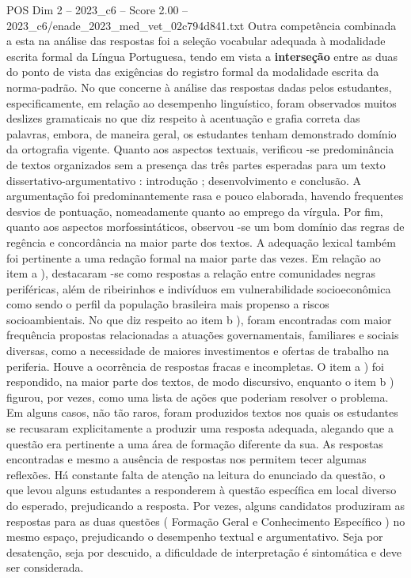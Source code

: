 \begin{textsample}{POS Dim 2 – 2023\_c6 – Score 2.00 – 2023\_c6/enade\_2023\_med\_vet\_02c794d841.txt}
Outra competência combinada a esta na análise das respostas foi a seleção vocabular adequada à modalidade escrita formal da Língua Portuguesa, tendo em vista a \textbf{interseção} entre as duas do ponto de vista das exigências do registro formal da modalidade escrita da norma-padrão.
No que concerne à análise das respostas dadas pelos estudantes, especificamente, em relação ao desempenho linguístico, foram observados muitos deslizes gramaticais no que diz respeito à acentuação e grafia correta das palavras, embora, de maneira geral, os estudantes tenham demonstrado domínio da ortografia vigente.
Quanto aos aspectos textuais, verificou -se predominância de textos organizados sem a presença das três partes esperadas para um texto dissertativo-argumentativo : introdução ; desenvolvimento e conclusão.
A argumentação foi predominantemente rasa e pouco elaborada, havendo frequentes desvios de pontuação, nomeadamente quanto ao emprego da vírgula.
Por fim, quanto aos aspectos morfossintáticos, observou -se um bom domínio das regras de regência e concordância na maior parte dos textos.
A adequação lexical também foi pertinente a uma redação formal na maior parte das vezes.
Em relação ao item a ), destacaram -se como respostas a relação entre comunidades negras periféricas, além de ribeirinhos e indivíduos em vulnerabilidade socioeconômica como sendo o perfil da população brasileira mais propenso a riscos socioambientais.
No que diz respeito ao item b ), foram encontradas com maior frequência propostas relacionadas a atuações governamentais, familiares e sociais diversas, como a necessidade de maiores investimentos e ofertas de trabalho na periferia.
Houve a ocorrência de respostas fracas e incompletas.
O item a ) foi respondido, na maior parte dos textos, de modo discursivo, enquanto o item b ) figurou, por vezes, como uma lista de ações que poderiam resolver o problema.
Em alguns casos, não tão raros, foram produzidos textos nos quais os estudantes se recusaram explicitamente a produzir uma resposta adequada, alegando que a questão era pertinente a uma área de formação diferente da sua.
As respostas encontradas e mesmo a ausência de respostas nos permitem tecer algumas reflexões.
Há constante falta de atenção na leitura do enunciado da questão, o que levou alguns estudantes a responderem à questão específica em local diverso do esperado, prejudicando a resposta.
Por vezes, alguns candidatos produziram as respostas para as duas questões ( Formação Geral e Conhecimento Específico ) no mesmo espaço, prejudicando o desempenho textual e argumentativo.
Seja por desatenção, seja por descuido, a dificuldade de interpretação é sintomática e deve ser considerada.

\end{textsample}
